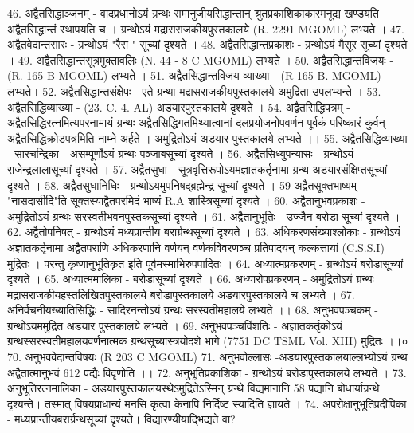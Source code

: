 46. अद्वैतसिद्धाञ्जनम् -
	वादप्रधानोऽयं ग्रन्थः रामानुजीयसिद्धान्तान् श्रुतप्रकाशिकाकारमनूद्य खण्डयति अद्वैतसिद्धान्तं स्थापयति च । ग्रन्थोऽयं मद्रासराजकीयपुस्तकालये (R. 2291 MGOML) लभ्यते । 
47. अद्वैतवेदान्तसारः - ग्रन्थोऽयं "रैस " सूच्यां दृश्यते । 
48. अद्वैतसिद्धान्तप्रकाशः - ग्रन्थोऽयं मैसूर सूच्यां दृश्यते । 
49. अद्वैतसिद्धान्तसूत्रमुक्तावलिः (N. 44 - 8 C MGOML) लभ्यते । 
50. अद्वैतसिद्धान्तविजयः - (R. 165 B MGOML) लभ्यते ।
51. अद्वैतसिद्धान्तविजय व्याख्या - (R 165 B. MGOML) लभ्यते। 
52. अद्वैतसिद्धान्तसंक्षेपः - 
	एते ग्रन्था मद्रासराजकीयपुस्तकालये अमुद्रिता उपलभ्यन्ते ।
53. अद्वैतसिद्धिव्याख्या - (23. C. 4. AL) अडयारपुस्तकालये दृश्यते । 
54. अद्वैतसिद्धिपत्रम् -
	अद्वैतसिद्धिरत्नमित्यपरनामायं ग्रन्थः अद्वैतसिद्धिगतमिथ्यात्वानां दलप्रयोजनोपवर्णन पूर्वकं परिष्कारं कुर्वन् अद्वैतसिद्धिक्रोडपत्रमिति नाम्ने अर्हते । अमुद्रितोऽयं अडयार पुस्तकालये लभ्यते ।। 
55. अद्वैतसिद्धिव्याख्या - सारचन्द्रिका - असम्पूर्णोऽयं ग्रन्थः पञ्जाबसूच्यां दृश्यते । 
56. अद्वैतसिध्युपन्यासः - ग्रन्थोऽयं राजेन्द्रलालासूच्यां दृश्यते । 
57. अद्वैतसुधा - सूत्रवृत्तिरूपोऽयमज्ञातकर्तृनामा ग्रन्थ अडयारसंक्षिप्तसूच्यां दृश्यते । 
58. अद्वैतसुधानिधिः - ग्रन्थोऽयमुपनिषद्ब्रह्मेन्द्र सूच्यां दृश्यते । 
59 अद्वैतसूक्तभाष्यम् - "नासदासीदि"ति सूक्तस्याद्वैतपरमिदं भाष्यं R.A शास्त्रिसूच्यां दृश्यते । 
60. अद्वैतानुभवप्रकाशः - अमुद्रितोऽयं ग्रन्थः सरस्वतीभवनपुस्तकसूच्यां दृश्यते । 
61. अद्वैतानुभूतिः - उज्जैन-बरोडा सूच्यां दृश्यते । 
62. अद्वैतोपनिषत् - ग्रन्थोऽयं मध्यप्रान्तीय बरार्ग्रन्थसूच्यां दृश्यते । 
63. अधिकरणसंख्याश्लोकाः - 
	ग्रन्थोऽयं अज्ञातकर्तृनामा अद्वैतपराणि अधिकरणानि वर्णयन् वर्णकविवरणञ्च प्रतिपादयन् कल्कत्तायां (C.S.S.I) मुद्रितः । परन्तु कृष्णानुभूतिकृत इति पूर्वमस्माभिरुपपादितः ।
64. अध्यात्मप्रकरणम् - ग्रन्थोऽयं बरोडासूच्यां दृश्यते ।
65. अध्यात्ममालिका - बरोडासूच्यां दृश्यते । 
66. अध्यारोपप्रकरणम् - अमुद्रितोऽयं ग्रन्थः मद्रासराजकीयहस्तलिखितपुस्तकालये बरोडापुस्तकालये अडयारपुस्तकालये च लभ्यते । 
67. अनिर्वचनीयख्यातिसिद्धिः - सादिरनन्तोऽयं ग्रन्थः सरस्वतीमहालये लभ्यते ।। 
68. अनुभवपञ्चकम् - ग्रन्थोऽयममुद्रित अडयार पुस्तकालये लभ्यते ।
69. अनुभवपञ्चविंशतिः - अज्ञातकर्तृकोऽयं ग्रन्थस्सरस्वतीमहालयवर्णनात्मक ग्रन्थसूच्यास्त्रयोदशे भागे (7751 DC TSML Vol. XIII) मुद्रितः ।।०
70. अनुभववेदान्तविषयः (R 203 C MGOML)
71. अनुभवोल्लासः -अडयारपुस्तकालयाल्लभ्योऽयं ग्रन्थ अद्वैतात्मानुभवं 612 पद्यैः विवृणोति ।। 
72. अनुभूतिप्रकाशिका - ग्रन्थोऽयं बरोडापुस्तकालये लभ्यते ।
73. अनुभूतिरत्नमालिका -
	अडयारपुस्तकालयस्थेऽमुद्रितेऽस्मिन् ग्रन्थे विद्यमानानि 58 पद्यानि बोधार्याग्रन्थे दृश्यन्ते। तस्मात् विषयप्राधान्यं मनसि कृत्वा केनापि निर्दिष्ट स्यादिति ज्ञायते । 	
74. अपरोक्षानुभूतिप्रदीपिका - मध्यप्रान्तीयबरार्ग्रन्थसूच्यां दृश्यते। विद्यारण्यीयाद्भिद्यते वा? 
